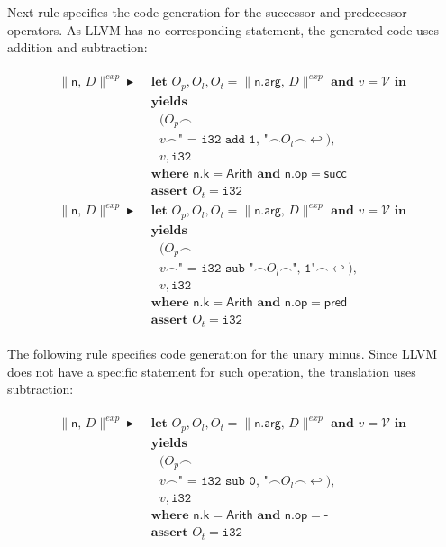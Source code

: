 \documentclass{article}
\newcommand{\trad}[2]{\ensuremath{\lVert \textsf{#1} \rVert^{\textit{#2}}}}
\newcommand{\nl}[0]{\ensuremath{\hookleftarrow}}
\DeclareMathOperator{\conc}{\smallfrown}
\DeclareMathOperator{\isdef}{\blacktriangleright}
\begin{document}
Next rule specifies the code generation for the successor and
predecessor operators. As LLVM has no corresponding statement, the
generated code uses addition and subtraction:
\begin{framed}
\begin{align}
\begin{split}
  \trad{n, $D$}{exp} \isdef & \textbf{ let } O_p, O_l, O_t =
  \trad{n.arg, $D$}{exp} \textbf{ and } v = \mathcal{V} \textbf{ in } \\
  & \textbf{ yields} \\
  & \quad (O_p \conc \\
  & \quad v \conc \texttt{" = i32 add 1, "} \conc O_l \conc \nl), \\
  & \quad v, \texttt{i32} \\
  & \textbf{ where } \textsf{n.k} = \textsf{Arith} \textbf{ and } \textsf{n.op} = \textsf{succ} \\
  & \textbf{ assert } O_t = \texttt{i32} \\
  \trad{n, $D$}{exp} \isdef & \textbf{ let } O_p, O_l, O_t =
  \trad{n.arg, $D$}{exp} \textbf{ and } v = \mathcal{V} \textbf{ in } \\
  & \textbf{ yields} \\
  & \quad (O_p \conc \\
  & \quad v \conc \texttt{" = i32 sub "} \conc O_l \conc \texttt{", 1"} \conc \nl), \\
  & \quad v, \texttt{i32} \\
  & \textbf{ where } \textsf{n.k} = \textsf{Arith} \textbf{ and } \textsf{n.op} = \textsf{pred} \\
  & \textbf{ assert } O_t = \texttt{i32}
\end{split}
\end{align}
\end{framed}

The following rule specifies code generation for the unary
minus. Since LLVM does not have a specific statement for such
operation, the translation uses subtraction:
\begin{framed}
\begin{align}
\begin{split}
  \trad{n, $D$}{exp} \isdef & \textbf{ let } O_p, O_l, O_t =
  \trad{n.arg, $D$}{exp} \textbf{ and } v = \mathcal{V} \textbf{ in } \\
  & \textbf{ yields} \\
  & \quad (O_p \conc \\
  & \quad v \conc \texttt{" = i32 sub 0, "} \conc O_l \conc \nl), \\
  & \quad v, \texttt{i32} \\
  & \textbf{ where } \textsf{n.k} = \textsf{Arith} \textbf{ and } \textsf{n.op} = \textsf{-} \\
  & \textbf{ assert } O_t = \texttt{i32}
\end{split}
\end{align}
\end{framed}
\end{document}
